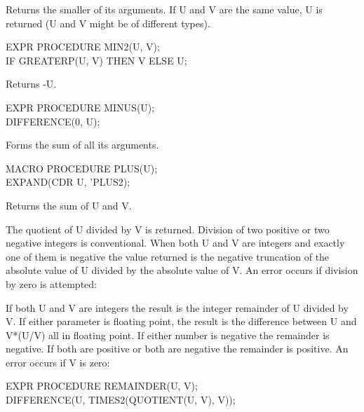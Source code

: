 {Returns the smaller of its arguments. If U and V are the same value,
U is returned (U and V might be of different types).

{\tt \begin{tabbing} EXPR PROCEDURE MIN2(U, V); \\
\hspace*{1em} IF GREATERP(U, V) THEN V ELSE U;
\end{tabbing}}}


{Returns -U.

{\tt \begin{tabbing} EXPR PROCEDURE MINUS(U); \\
\hspace*{1em} DIFFERENCE(0, U);
\end{tabbing}}}


{Forms the sum of all its arguments.

{\tt \begin{tabbing} MACRO PROCEDURE PLUS(U); \\
\hspace*{1em} EXPAND(CDR U, 'PLUS2);
\end{tabbing}}}

{Returns the sum of U and V.}


{The quotient of U divided by V is returned. Division of two positive
or two negative integers is conventional. When both U and V are
integers and exactly one of them is negative the value returned is the
negative truncation of the absolute value of U divided by the absolute
value of V. An error occurs if division by zero is attempted:

}

{If both U and V are integers the result is the integer remainder of U
divided by V. If either parameter is floating point, the result is the
difference between U and V*(U/V) all in floating point. If either
number is negative the remainder is negative. If both are positive or
both are negative the remainder is positive. An error occurs if V is
zero: 


{\tt \begin{tabbing} EXPR PROCEDURE REMAINDER(U, V); \\
\hspace*{1em} DIFFERENCE(U, TIMES2(QUOTIENT(U, V), V));
\end{tabbing}}}


